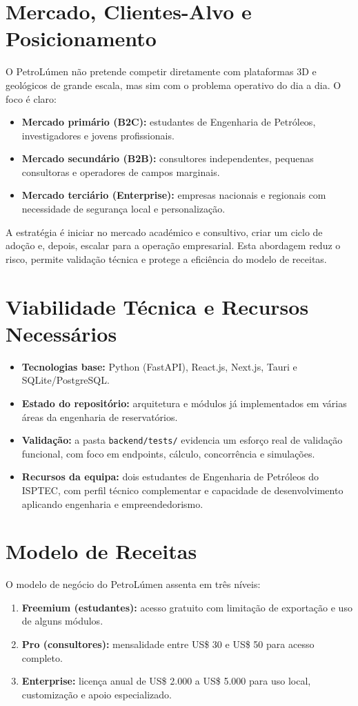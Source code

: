 \documentclass[11pt,a4paper]{article}
\begin{document}
\section{Mercado, Clientes-Alvo e Posicionamento}
O PetroLúmen não pretende competir diretamente com plataformas 3D e geológicos de grande escala, mas sim com o problema operativo do dia a dia. O foco é claro:

\begin{itemize}
    \item \textbf{Mercado primário (B2C):} estudantes de Engenharia de Petróleos, investigadores e jovens profissionais.
    \item \textbf{Mercado secundário (B2B):} consultores independentes, pequenas consultoras e operadores de campos marginais.
    \item \textbf{Mercado terciário (Enterprise):} empresas nacionais e regionais com necessidade de segurança local e personalização.
\end{itemize}

A estratégia é iniciar no mercado académico e consultivo, criar um ciclo de adoção e, depois, escalar para a operação empresarial. Esta abordagem reduz o risco, permite validação técnica e protege a eficiência do modelo de receitas.

\section{Viabilidade Técnica e Recursos Necessários}
\begin{itemize}
    \item \textbf{Tecnologias base:} Python (FastAPI), React.js, Next.js, Tauri e SQLite/PostgreSQL.
    \item \textbf{Estado do repositório:} arquitetura e módulos já implementados em várias áreas da engenharia de reservatórios.
    \item \textbf{Validação:} a pasta \texttt{backend/tests/} evidencia um esforço real de validação funcional, com foco em endpoints, cálculo, concorrência e simulações.
    \item \textbf{Recursos da equipa:} dois estudantes de Engenharia de Petróleos do ISPTEC, com perfil técnico complementar e capacidade de desenvolvimento aplicando engenharia e empreendedorismo.
\end{itemize}

\section{Modelo de Receitas}
O modelo de negócio do PetroLúmen assenta em três níveis:
\begin{enumerate}
    \item \textbf{Freemium (estudantes):} acesso gratuito com limitação de exportação e uso de alguns módulos.
    \item \textbf{Pro (consultores):} mensalidade entre US\$ 30 e US\$ 50 para acesso completo.
    \item \textbf{Enterprise:} licença anual de US\$ 2.000 a US\$ 5.000 para uso local, customização e apoio especializado.
\end{enumerate}
\end{document}
